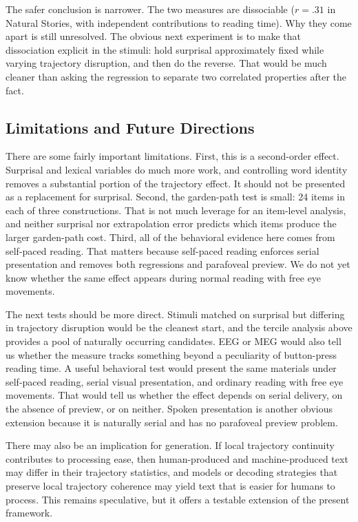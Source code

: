\documentclass[12pt]{article}
\newcommand{\new}[1]{#1}   %
\begin{document}
The safer conclusion is narrower. The two measures are dissociable \new{($r = .31$ in Natural Stories, with independent contributions to reading time)}. Why they come apart is still unresolved. The obvious next experiment is to make that dissociation explicit in the stimuli: hold surprisal approximately fixed while varying trajectory disruption, and then do the reverse. That would be much cleaner than asking the regression to separate two correlated properties after the fact.

\subsection{Limitations and Future Directions}

\new{There are some fairly important limitations. First, this is a second-order effect. Surprisal and lexical variables do much more work, and controlling word identity removes a substantial portion of the trajectory effect. It should not be presented as a replacement for surprisal. Second, the garden-path test is small: 24 items in each of three constructions. That is not much leverage for an item-level analysis, and neither surprisal nor extrapolation error predicts which items produce the larger garden-path cost. Third, all of the behavioral evidence here comes from self-paced reading. That matters because self-paced reading enforces serial presentation and removes both regressions and parafoveal preview. We do not yet know whether the same effect appears during normal reading with free eye movements.}

The next tests should be more direct. Stimuli matched on surprisal but differing in trajectory disruption would be the cleanest start\new{, and the tercile analysis above provides a pool of naturally occurring candidates}. EEG or MEG would also tell us whether the measure tracks something beyond a peculiarity of button-press reading time. \new{A useful behavioral test would present the same materials under self-paced reading, serial visual presentation, and ordinary reading with free eye movements. That would tell us whether the effect depends on serial delivery, on the absence of preview, or on neither. Spoken presentation is another obvious extension because it is naturally serial and has no parafoveal preview problem.}

There may also be an implication for generation. If local trajectory continuity contributes to processing ease, then human-produced and machine-produced text may differ in their trajectory statistics, and models or decoding strategies that preserve local trajectory coherence may yield text that is easier for humans to process. This remains speculative, but it offers a testable extension of the present framework.
\end{document}
